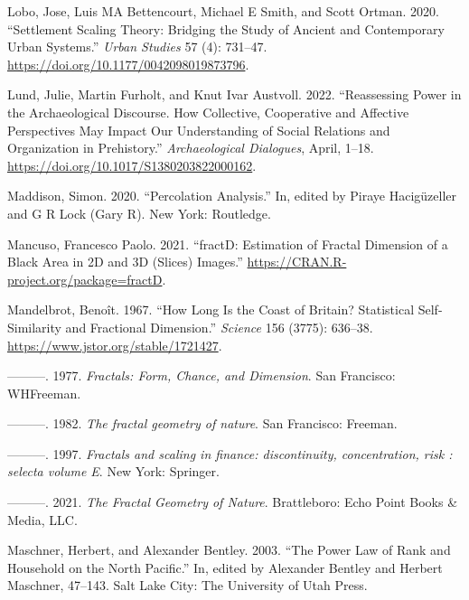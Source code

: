 \documentclass[
  12pt,
  a4paper, twoside]{book}
\newlength{\cslhangindent}
\newlength{\cslentryspacingunit} %
\newenvironment{CSLReferences}[2] %
 {%
  \setlength{\parindent}{0pt}
  \ifodd #1
  \let\oldpar\par
  \def\par{\hangindent=\cslhangindent\oldpar}
  \fi
  \setlength{\parskip}{#2\cslentryspacingunit}
 }%
 {}
\begin{document}
\begin{CSLReferences}{1}{0}
\leavevmode{}%
Lobo, Jose, Luis MA Bettencourt, Michael E Smith, and Scott Ortman. 2020. {``Settlement Scaling Theory: Bridging the Study of Ancient and Contemporary Urban Systems.''} \emph{Urban Studies} 57 (4): 731--47. \url{https://doi.org/10.1177/0042098019873796}.

\leavevmode{}%
Lund, Julie, Martin Furholt, and Knut Ivar Austvoll. 2022. {``Reassessing Power in the Archaeological Discourse. How Collective, Cooperative and Affective Perspectives May Impact Our Understanding of Social Relations and Organization in Prehistory.''} \emph{Archaeological Dialogues}, April, 1--18. \url{https://doi.org/10.1017/S1380203822000162}.

\leavevmode{}%
Maddison, Simon. 2020. {``Percolation Analysis.''} In, edited by Piraye Hacigüzeller and G R Lock (Gary R). New York: Routledge.

\leavevmode{}%
Mancuso, Francesco Paolo. 2021. {``fractD: Estimation of Fractal Dimension of a Black Area in 2D and 3D (Slices) Images.''} \url{https://CRAN.R-project.org/package=fractD}.

\leavevmode{}%
Mandelbrot, Benoît. 1967. {``How Long Is the Coast of Britain? Statistical Self-Similarity and Fractional Dimension.''} \emph{Science} 156 (3775): 636--38. \url{https://www.jstor.org/stable/1721427}.

\leavevmode{}%
---------. 1977. \emph{Fractals: Form, Chance, and Dimension}. {San Francisco}: {WHFreeman}.

\leavevmode{}%
---------. 1982. \emph{The fractal geometry of nature}. San Francisco: Freeman.

\leavevmode{}%
---------. 1997. \emph{Fractals and scaling in finance: discontinuity, concentration, risk : selecta volume E}. New York: Springer.

\leavevmode{}%
---------. 2021. \emph{The Fractal Geometry of Nature}. Brattleboro: Echo Point Books \& Media, LLC.

\leavevmode{}%
Maschner, Herbert, and Alexander Bentley. 2003. {``The Power Law of Rank and Household on the North Pacific.''} In, edited by Alexander Bentley and Herbert Maschner, 47--143. Salt Lake City: The University of Utah Press.


\end{CSLReferences}
\end{document}
